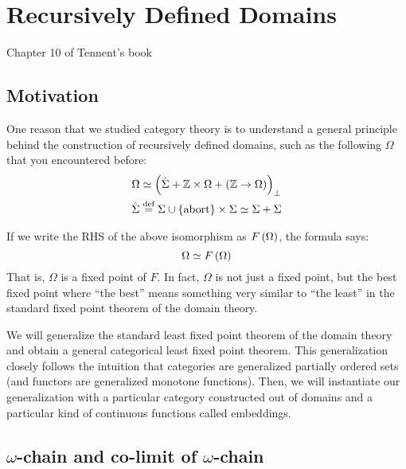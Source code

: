 \chapter{Recursively Defined Domains}

Chapter 10 of Tennent's book

\section{Motivation}

\begin{enumcirc}
	\item
	One reason that we studied category theory is to understand a general principle
	behind the construction of recursively defined domains, such as the following
	$\Omega$ that you encountered before:
	\begin{align*}
		\Omega       & \simeq \left( \hat{\Sigma} + \mathbb{Z} \times \Omega + \left( \mathbb{Z} \to \Omega \right) \right)_\bot \\
		\hat{\Sigma} & \stackrel{\text{def}}{=} \Sigma \cup \left\{ \textrm{abort} \right\} \times \Sigma \simeq \Sigma + \Sigma     \\
	\end{align*}
	\item
	If we write the RHS of the above isomorphism as $F\left( \Omega \right)$, the formula
	says:
	\[
		\Omega \simeq F\left( \Omega \right)
	\]
	That is, $\Omega$ is a fixed point of $F$.
	In fact, $\Omega$ is not just a fixed point, but the best fixed point where
	``the best'' means something very similar to ``the least'' in the standard
	fixed point theorem of the domain theory.
	\item
	We will generalize the standard least fixed point theorem of the domain theory
	and obtain a general categorical least fixed point theorem.
	This generalization closely follows the intuition that categories are
	generalized partially ordered sets (and functors are generalized monotone
	functions).
	Then, we will instantiate our generalization with a particular category
	constructed out of domains and a particular kind of continuous functions called
	embeddings.
\end{enumcirc}

\section{$\omega$-chain and co-limit of $\omega$-chain}

